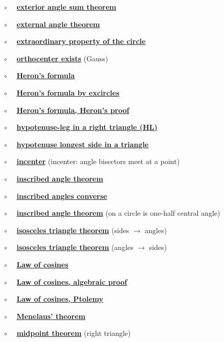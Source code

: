 \documentclass[11pt, oneside]{article}
\begin{document}
$\circ$ \ \ \hyperref[sec:exterior_angle_sum_theorem]{\textbf{exterior angle sum theorem}}

$\circ$ \ \ \hyperref[sec:external_angle_theorem]{\textbf{external angle theorem}}

$\circ$ \ \ \hyperref[sec:extraordinary_property]{\textbf{extraordinary property of the circle}}

$\circ$ \ \ \hyperref[sec:Gauss_orthocenter]{\textbf{orthocenter exists}} (Gauss)

$\circ$ \ \ \hyperref[sec:Heron_formula]{\textbf{Heron's formula}}

$\circ$ \ \ \hyperref[sec:Heron_formula_excircles]{\textbf{Heron's formula by excircles}}

$\circ$ \ \ \hyperref[sec:Heron_formula_Heron]{\textbf{Heron's formula, Heron's proof}}

$\circ$ \ \ \hyperref[sec:SSA_in_right]{\textbf{hypotenuse-leg in a right triangle (HL)}}

$\circ$ \ \ \hyperref[sec:hypotenuse_longest]{\textbf{hypotenuse longest side in a triangle}}

$\circ$ \ \ \hyperref[sec:incenter]{\textbf{incenter}} (incenter:  angle bisectors meet at a point)

$\circ$ \ \ \hyperref[sec:equal_angles_same_arc]{\textbf{inscribed angle theorem}}

$\circ$ \ \ \hyperref[sec:inscribed_angles_converse]{\textbf{inscribed angles converse}}

$\circ$ \ \ \hyperref[sec:peripheral_angle]{\textbf{inscribed angle theorem}} (on a circle is one-half central angle)

$\circ$ \ \  \hyperref[sec:isosceles_triangle_theorem]{\textbf{isosceles triangle theorem}} (sides $\rightarrow$ angles)

$\circ$ \ \  \hyperref[sec:isosceles_converse]{\textbf{isosceles triangle theorem}} (angles $\rightarrow$ sides)

$\circ$ \ \ \hyperref[sec:law_of_cosines]{\textbf{Law of cosines}}

$\circ$ \ \ \hyperref[sec:law_of_cosines_algebraic]{\textbf{Law of cosines, algebraic proof}}

$\circ$ \ \ \hyperref[sec:LOC_by_Ptolemy]{\textbf{Law of cosines, Ptolemy}}

$\circ$ \ \ \hyperref[sec:Menelaus_theorem]{\textbf{Menelaus' theorem}}

$\circ$ \ \ \hyperref[sec:right_triangle_midpoint_theorem]{\textbf{midpoint theorem}} (right triangle)
\end{document}
